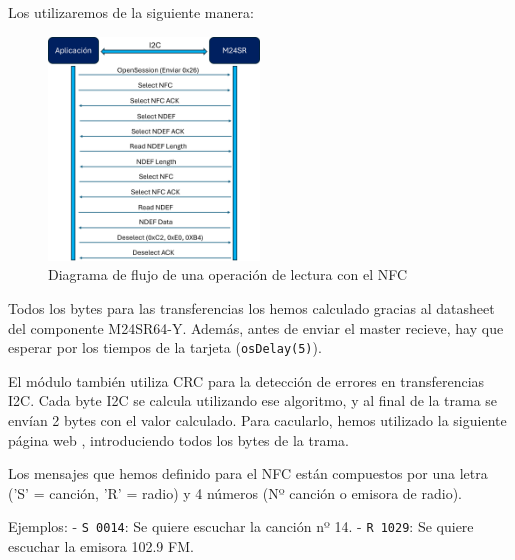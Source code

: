 Los utilizaremos de la siguiente manera:

\begin{figure}[h]
    \centering
    \includegraphics[width=0.5\textwidth]{images/3/3-2/SD/Diagrama.png}
    \caption{Diagrama de flujo de una operación de lectura con el NFC}
    \label{fig:label}
\end{figure}

Todos los bytes para las transferencias los hemos calculado gracias al datasheet del componente M24SR64-Y. Además, antes de enviar el master recieve, hay que esperar por los tiempos de la tarjeta (\texttt{osDelay(5)}).

El módulo también utiliza CRC para la detección de errores en transferencias I2C. Cada byte I2C se calcula utilizando ese algoritmo, y al final de la trama se envían 2 bytes con el valor calculado. Para cacularlo, hemos utilizado la siguiente página web \cite{CalculoCRC}, introduciendo todos los bytes de la trama.

Los mensajes que hemos definido para el NFC están compuestos por una letra ('S' = canción, 'R' = radio) y 4 números (Nº canción o emisora de radio).

Ejemplos: 
	- \texttt{S 0014}: Se quiere escuchar la canción nº 14.
	- \texttt{R 1029}: Se quiere escuchar la emisora 102.9 FM.